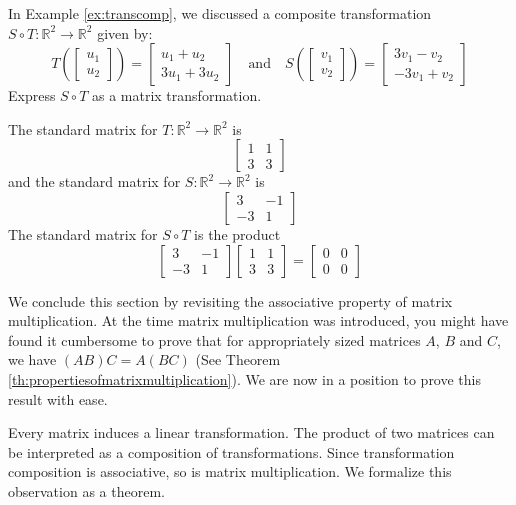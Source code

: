 \documentclass{ximera}
\newcommand{\RR}{\mathbb{R}}
\begin{document}
\begin{example}
In Example \ref{ex:transcomp}, we discussed a composite transformation $S\circ T:\RR^2\rightarrow \RR^2$
given by:
$$T\left(\begin{bmatrix}u_1\\u_2\end{bmatrix}\right)=\begin{bmatrix}u_1+u_2\\3u_1+3u_2\end{bmatrix}\quad \text{and} \quad
S\left(\begin{bmatrix}v_1\\v_2\end{bmatrix}\right)=\begin{bmatrix}3v_1-v_2\\-3v_1+v_2\end{bmatrix}$$
Express $S\circ T$ as a matrix transformation.
\begin{explanation}
The standard matrix for $T:\RR^2\rightarrow \RR^2$ is $$\begin{bmatrix}1&1\\3&3\end{bmatrix}$$ and the standard matrix for $S:\RR^2\rightarrow \RR^2$ is $$\begin{bmatrix}3&-1\\-3&1\end{bmatrix}$$
The standard matrix for $S\circ T$ is the product
$$\begin{bmatrix}3&-1\\-3&1\end{bmatrix}\begin{bmatrix}1&1\\3&3\end{bmatrix}=\begin{bmatrix}0&0\\0&0\end{bmatrix}$$
\end{explanation}
\end{example}

We conclude this section by revisiting the associative property of matrix multiplication.  At the time matrix multiplication was introduced, you might have found it cumbersome to prove that for appropriately sized matrices $A$, $B$ and $C$, we have $(AB)C=A(BC)$ (See Theorem \ref{th:propertiesofmatrixmultiplication}).  We are now in a position to prove this result with ease.  

Every matrix induces a linear transformation.  The product of two matrices can be interpreted as a composition of transformations.  Since transformation composition is associative, so is matrix multiplication. We formalize this observation as a theorem.
\end{document}
